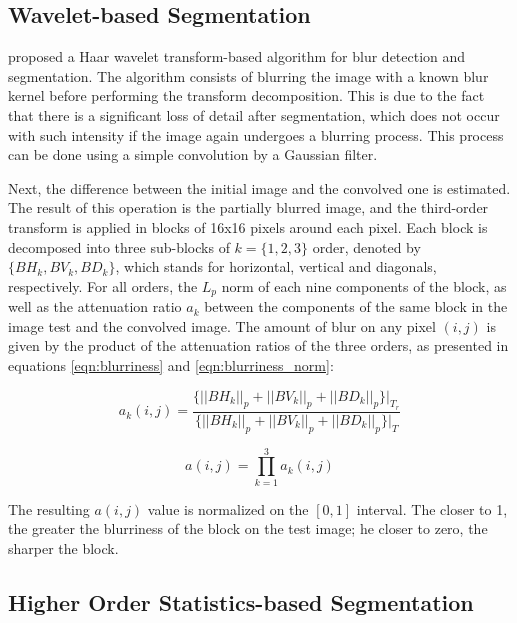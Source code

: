 \subsection{Wavelet-based Segmentation}

 proposed a Haar wavelet transform-based algorithm for blur detection and segmentation. The algorithm consists of blurring the image with a known blur kernel before performing the transform decomposition. This is due to the fact that there is a significant loss of detail after segmentation, which does not occur with such intensity if the image again undergoes a blurring process. This process can be done using a simple convolution by a Gaussian filter.

Next, the difference between the initial image and the convolved one is estimated. The result of this operation is the partially blurred image, and the third-order transform is applied
in blocks of 16x16 pixels around each pixel. Each block is decomposed into three sub-blocks of
$k = \{1, 2, 3\}$ order, denoted by $\{BH_k, BV_k, BD_k \}$, which stands for horizontal, vertical and diagonals, respectively. For all orders, the $L_p$ norm of each nine components of the block, as well as the attenuation ratio $a_k$ between the components of the same block in the image test and the convolved image. The amount of blur on any pixel $(i, j)$ is given by the product of the attenuation ratios of the three orders, as presented in equations \ref{eqn:blurriness} and \ref{eqn:blurriness_norm}:

\begin{equation}
\label{eqn:blurriness}
a_k(i,j) =
    \frac
        {
            \Big\{
                ||BH_k||_p + ||BV_k||_p + ||BD_k||_p
            \Big\}
            \Big|_{T_r}
        }
        {
            \Big\{
                ||BH_k||_p + ||BV_k||_p + ||BD_k||_p
            \Big\}
            \Big|_T
        }
\end{equation}

\begin{equation}
\label{eqn:blurriness_norm}
a(i,j) = \prod_{k=1}^3a_k(i,j)
\end{equation}

The resulting $a(i, j)$ value is normalized on the $[0,1]$ interval. The closer to 1, the greater the blurriness of the block on the test image; he closer to zero, the sharper the block.

\subsection{Higher Order Statistics-based Segmentation}

